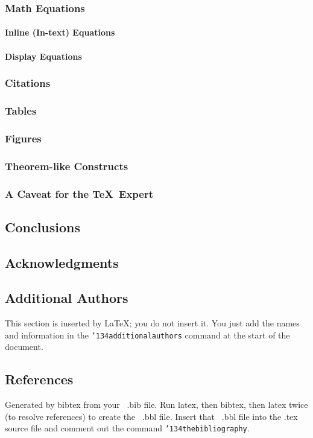 \documentclass{sig-alternate}
\begin{document}
\subsubsection{Math Equations}
\paragraph{Inline (In-text) Equations}
\paragraph{Display Equations}
\subsubsection{Citations}
\subsubsection{Tables}
\subsubsection{Figures}
\subsubsection{Theorem-like Constructs}
\subsubsection*{A Caveat for the \TeX\ Expert}
\subsection{Conclusions}
\subsection{Acknowledgments}
\subsection{Additional Authors}
This section is inserted by \LaTeX; you do not insert it.
You just add the names and information in the
\texttt{{\char'134}additionalauthors} command at the start
of the document.
\subsection{References}
Generated by bibtex from your ~.bib file.  Run latex,
then bibtex, then latex twice (to resolve references)
to create the ~.bbl file.  Insert that ~.bbl file into
the .tex source file and comment out
the command \texttt{{\char'134}thebibliography}.
\end{document}
